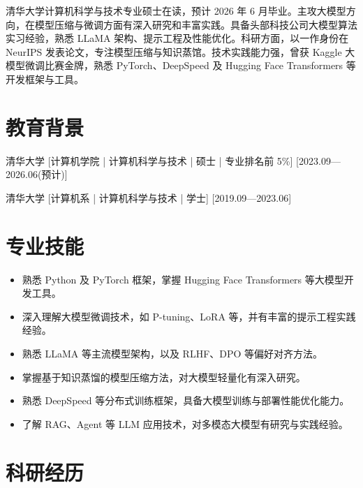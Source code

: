 \documentclass{resume-photo}
\begin{document}

\ResumeTitle


\noindent 清华大学计算机科学与技术专业硕士在读，预计 2026 年 6 月毕业。主攻大模型方向，在模型压缩与微调方面有深入研究和丰富实践。具备头部科技公司大模型算法实习经验，熟悉 LLaMA 架构、提示工程及性能优化。科研方面，以一作身份在 NeurIPS 发表论文，专注模型压缩与知识蒸馆。技术实践能力强，曾获 Kaggle 大模型微调比赛金牌，熟悉 PyTorch、DeepSpeed 及 Hugging Face Transformers 等开发框架与工具。


\section{教育背景}
\ResumeItem
{清华大学}
[\textnormal{计算机学院 | 计算机科学与技术 | 硕士 | 专业排名前 5\%}]
[2023.09—2026.06(预计)]

\ResumeItem
{清华大学}
[\textnormal{计算机系 | 计算机科学与技术 | 学士}]
[2019.09—2023.06]

\section{专业技能}
\begin{itemize}
  \item 熟悉 Python 及 PyTorch 框架，掌握 Hugging Face Transformers 等大模型开发工具。
  \item 深入理解大模型微调技术，如 P-tuning、LoRA 等，并有丰富的提示工程实践经验。
  \item 熟悉 LLaMA 等主流模型架构，以及 RLHF、DPO 等偏好对齐方法。
  \item 掌握基于知识蒸馏的模型压缩方法，对大模型轻量化有深入研究。
  \item 熟悉 DeepSpeed 等分布式训练框架，具备大模型训练与部署性能优化能力。
  \item 了解 RAG、Agent 等 LLM 应用技术，对多模态大模型有研究与实践经验。
\end{itemize}

\section{科研经历}
\end{document}
